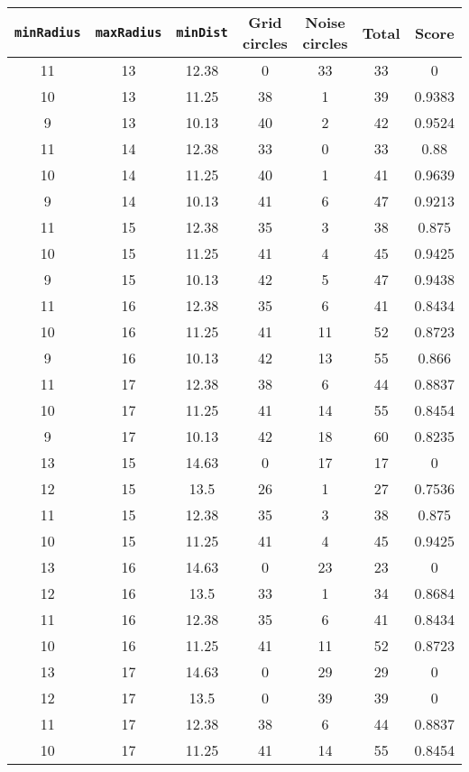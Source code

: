 \documentclass[letterpaper, 12pt]{article}
\begin{document}
\begin{longtable}{|c|c|c|c|c|c|c|}
\hline
\textbf{\texttt{minRadius}} & \textbf{\texttt{maxRadius}} & \textbf{\texttt{minDist}} & \textbf{Grid circles} & \textbf{Noise circles} & \textbf{Total} & \textbf{Score} \\
\hline
11 & 13 & 12.38 & 0 & 33 & 33 & 0 \\
\hline
10 & 13 & 11.25 & 38 & 1 & 39 & 0.9383 \\
\hline
9 & 13 & 10.13 & 40 & 2 & 42 & 0.9524 \\
\hline
11 & 14 & 12.38 & 33 & 0 & 33 & 0.88 \\
\hline
10 & 14 & 11.25 & 40 & 1 & 41 & 0.9639 \\
\hline
9 & 14 & 10.13 & 41 & 6 & 47 & 0.9213 \\
\hline
11 & 15 & 12.38 & 35 & 3 & 38 & 0.875 \\
\hline
10 & 15 & 11.25 & 41 & 4 & 45 & 0.9425 \\
\hline
9 & 15 & 10.13 & 42 & 5 & 47 & 0.9438 \\
\hline
11 & 16 & 12.38 & 35 & 6 & 41 & 0.8434 \\
\hline
10 & 16 & 11.25 & 41 & 11 & 52 & 0.8723 \\
\hline
9 & 16 & 10.13 & 42 & 13 & 55 & 0.866 \\
\hline
11 & 17 & 12.38 & 38 & 6 & 44 & 0.8837 \\
\hline
10 & 17 & 11.25 & 41 & 14 & 55 & 0.8454 \\
\hline
9 & 17 & 10.13 & 42 & 18 & 60 & 0.8235 \\
\hline
13 & 15 & 14.63 & 0 & 17 & 17 & 0 \\
\hline
12 & 15 & 13.5 & 26 & 1 & 27 & 0.7536 \\
\hline
11 & 15 & 12.38 & 35 & 3 & 38 & 0.875 \\
\hline
10 & 15 & 11.25 & 41 & 4 & 45 & 0.9425 \\
\hline
13 & 16 & 14.63 & 0 & 23 & 23 & 0 \\
\hline
12 & 16 & 13.5 & 33 & 1 & 34 & 0.8684 \\
\hline
11 & 16 & 12.38 & 35 & 6 & 41 & 0.8434 \\
\hline
10 & 16 & 11.25 & 41 & 11 & 52 & 0.8723 \\
\hline
13 & 17 & 14.63 & 0 & 29 & 29 & 0 \\
\hline
12 & 17 & 13.5 & 0 & 39 & 39 & 0 \\
\hline
11 & 17 & 12.38 & 38 & 6 & 44 & 0.8837 \\
\hline
10 & 17 & 11.25 & 41 & 14 & 55 & 0.8454 \\

\end{longtable}
\end{document}
